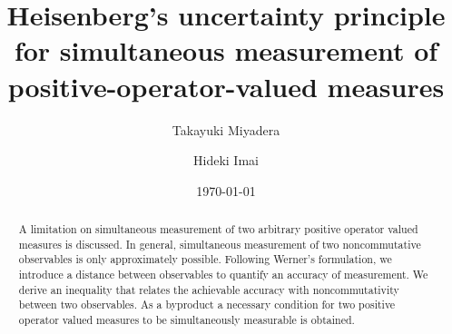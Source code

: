 \documentclass[showpacs,preprintnumbers,amsmath,amssymb]{revtex4}
\begin{document}

\title{
Heisenberg's uncertainty principle
 for simultaneous measurement of positive-operator-valued measures}

\author{Takayuki Miyadera}
\author{Hideki Imai}%
%


\date{\today}%

\begin{abstract}
A limitation on simultaneous measurement of two 
arbitrary positive operator valued measures is discussed. 
In general, simultaneous measurement of two noncommutative 
observables is only approximately possible. 
Following Werner's formulation, we introduce a distance 
between observables to quantify an accuracy of measurement. 
We derive an inequality that relates 
the achievable accuracy with noncommutativity between 
two observables. 
As a byproduct a necessary condition for 
two positive operator valued measures to be simultaneously 
measurable is obtained.    
\end{abstract}

\maketitle
\end{document}

